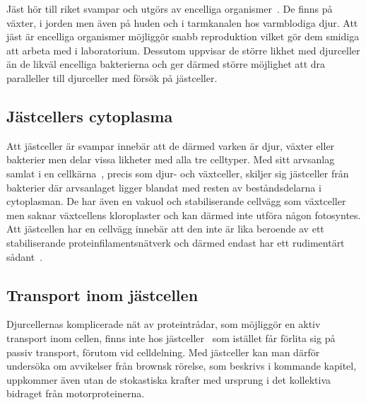Jäst hör till riket svampar och utgörs av encelliga organismer~\cite{SGD_yeast}.
De finns på växter, i jorden men även på huden och i tarmkanalen hos varmblodiga djur. 
Att jäst är encelliga organismer möjliggör snabb reproduktion vilket gör dem smidiga att arbeta med i laboratorium. Dessutom uppvisar de större likhet med djurceller än de likväl encelliga bakterierna och ger därmed större möjlighet att dra paralleller till djurceller med försök på jästceller. 

\subsection{Jästcellers cytoplasma}
Att jästceller är svampar innebär att de därmed varken är djur, växter eller bakterier men delar vissa likheter med alla tre celltyper. Med sitt arvsanlag samlat i en cellkärna~\cite{SGD_yeast}, precis som djur- och växtceller, skiljer sig jästceller från bakterier där arvsanlaget ligger blandat med resten av beståndsdelarna i cytoplasman.
De har även en vakuol och stabiliserande cellvägg som växtceller men saknar växtcellens kloroplaster och kan därmed inte utföra någon fotosyntes. Att jästcellen har en cellvägg innebär att den inte är lika beroende av ett stabiliserande proteinfilamentsnätverk och därmed endast har ett rudimentärt sådant~\cite{Midtveldt_etal2016}.

\subsection{Transport inom jästcellen}
Djurcellernas komplicerade nät av proteintrådar, som möjliggör en aktiv transport inom cellen, finns inte hos jästceller~\cite{Midtveldt_etal2016} som istället får förlita sig på passiv transport, förutom vid celldelning. 
Med jästceller kan man därför undersöka om avvikelser från brownsk rörelse, som beskrivs i kommande kapitel, uppkommer även utan de stokastiska krafter med ursprung i det kollektiva bidraget från motorproteinerna.


